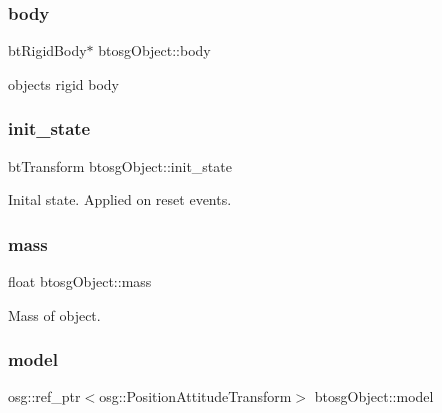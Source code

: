 \subsubsection{\texorpdfstring{body}{body}}
{\footnotesize\ttfamily bt\+Rigid\+Body$\ast$ btosg\+Object\+::body\hspace{0.3cm}{\ttfamily [inherited]}}



object\textquotesingle{}s rigid body 

\mbox{\label{classbtosgObject_a2dee023f311114e200df9b04c8c1b400}} 
\subsubsection{\texorpdfstring{init\_state}{init\_state}}
{\footnotesize\ttfamily bt\+Transform btosg\+Object\+::init\+\_\+state\hspace{0.3cm}{\ttfamily [inherited]}}



Inital state. Applied on reset events. 

\mbox{\label{classbtosgObject_a2418bb2194d5e9b0f1c51c84672ba7d1}} 
\subsubsection{\texorpdfstring{mass}{mass}}
{\footnotesize\ttfamily float btosg\+Object\+::mass\hspace{0.3cm}{\ttfamily [inherited]}}



Mass of object. 

\mbox{\label{classbtosgObject_afd15726e7a214212d6d5815f8ac1ac6c}} 
\subsubsection{\texorpdfstring{model}{model}}
{\footnotesize\ttfamily osg\+::ref\+\_\+ptr$<$osg\+::\+Position\+Attitude\+Transform$>$ btosg\+Object\+::model\hspace{0.3cm}{\ttfamily [inherited]}}



